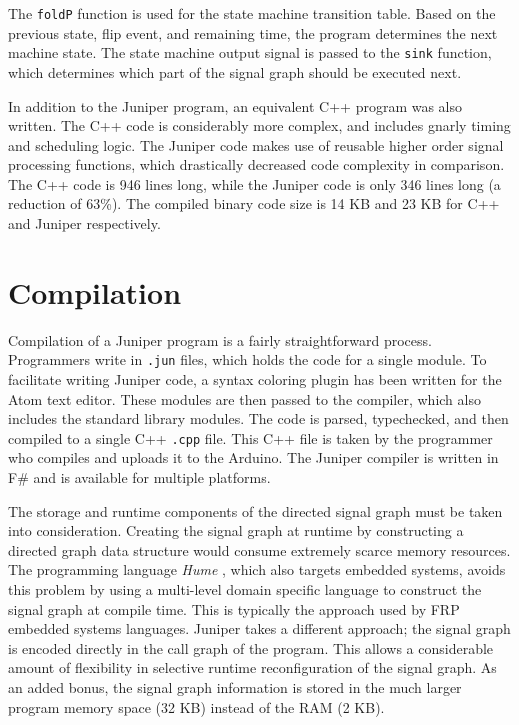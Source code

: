 \documentclass{sigplanconf}
\begin{document}
The \texttt{foldP} function is used for the state machine transition table. Based on the previous state, flip event, and remaining time, the program determines the next machine state. The state machine output signal is passed to the \texttt{sink} function, which determines which part of the signal graph should be executed next.

In addition to the Juniper program, an equivalent C++ program was also written. The C++ code is considerably more complex, and includes gnarly timing and scheduling logic. The Juniper code makes use of reusable higher order signal processing functions, which drastically decreased code complexity in comparison. The C++ code is 946 lines long, while the Juniper code is only 346 lines long (a reduction of 63\%). The compiled binary code size is 14 KB and 23 KB for C++ and Juniper respectively.

\section{Compilation}
Compilation of a Juniper program is a fairly straightforward process. Programmers write in \texttt{.jun} files, which holds the code for a single module. To facilitate writing Juniper code, a syntax coloring plugin has been written for the Atom text editor. These modules are then passed to the compiler, which also includes the standard library modules. The code is parsed, typechecked, and then compiled to a single C++ \texttt{.cpp} file. This C++ file is taken by the programmer who compiles and uploads it to the Arduino. The Juniper compiler is written in F\# and is available for multiple platforms.

The storage and runtime components of the directed signal graph must be taken into consideration. Creating the signal graph at runtime by constructing a directed graph data structure would consume extremely scarce memory resources. The programming language \textit{Hume} \citep{hume}, which also targets embedded systems, avoids this problem by using a multi-level domain specific language to construct the signal graph at compile time. This is typically the approach used by FRP embedded systems languages. Juniper takes a different approach; the signal graph is encoded directly in the call graph of the program. This allows a considerable amount of flexibility in selective runtime reconfiguration of the signal graph. As an added bonus, the signal graph information is stored in the much larger program memory space (32 KB) instead of the RAM (2 KB).
\end{document}
